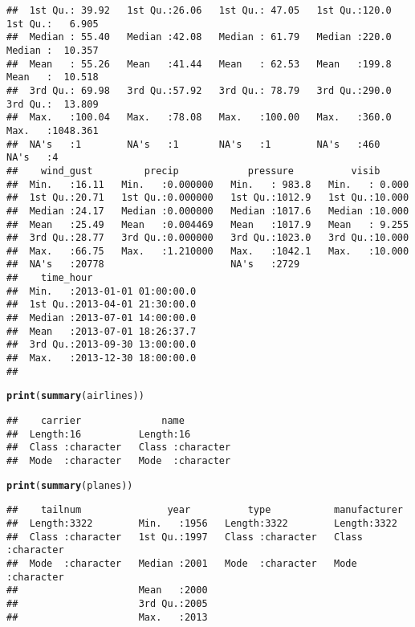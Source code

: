 \documentclass{article}\usepackage[]{graphicx}\usepackage[]{xcolor}
\makeatletter
\newcommand{\hlstd}[1]{\textcolor[rgb]{0.345,0.345,0.345}{#1}}%
\newcommand{\hlkwd}[1]{\textcolor[rgb]{0.737,0.353,0.396}{\textbf{#1}}}%
\newenvironment{kframe}{%
 \def\at@end@of@kframe{}%
 \ifinner\ifhmode%
  \def\at@end@of@kframe{\end{minipage}}%
  \begin{minipage}{\columnwidth}%
 \fi\fi%
 \def\FrameCommand##1{\hskip\@totalleftmargin \hskip-\fboxsep
 \colorbox{shadecolor}{##1}\hskip-\fboxsep
     \hskip-\linewidth \hskip-\@totalleftmargin \hskip\columnwidth}%
 \MakeFramed {\advance\hsize-\width
   \@totalleftmargin\z@ \linewidth\hsize
   \@setminipage}}%
 {\par\unskip\endMakeFramed%
 \at@end@of@kframe}
\newenvironment{knitrout}{}{} %
\makeatother
\begin{document}
\begin{knitrout}
\begin{kframe}
\begin{verbatim}
##  1st Qu.: 39.92   1st Qu.:26.06   1st Qu.: 47.05   1st Qu.:120.0   1st Qu.:   6.905  
##  Median : 55.40   Median :42.08   Median : 61.79   Median :220.0   Median :  10.357  
##  Mean   : 55.26   Mean   :41.44   Mean   : 62.53   Mean   :199.8   Mean   :  10.518  
##  3rd Qu.: 69.98   3rd Qu.:57.92   3rd Qu.: 78.79   3rd Qu.:290.0   3rd Qu.:  13.809  
##  Max.   :100.04   Max.   :78.08   Max.   :100.00   Max.   :360.0   Max.   :1048.361  
##  NA's   :1        NA's   :1       NA's   :1        NA's   :460     NA's   :4         
##    wind_gust         precip            pressure          visib       
##  Min.   :16.11   Min.   :0.000000   Min.   : 983.8   Min.   : 0.000  
##  1st Qu.:20.71   1st Qu.:0.000000   1st Qu.:1012.9   1st Qu.:10.000  
##  Median :24.17   Median :0.000000   Median :1017.6   Median :10.000  
##  Mean   :25.49   Mean   :0.004469   Mean   :1017.9   Mean   : 9.255  
##  3rd Qu.:28.77   3rd Qu.:0.000000   3rd Qu.:1023.0   3rd Qu.:10.000  
##  Max.   :66.75   Max.   :1.210000   Max.   :1042.1   Max.   :10.000  
##  NA's   :20778                      NA's   :2729                     
##    time_hour                    
##  Min.   :2013-01-01 01:00:00.0  
##  1st Qu.:2013-04-01 21:30:00.0  
##  Median :2013-07-01 14:00:00.0  
##  Mean   :2013-07-01 18:26:37.7  
##  3rd Qu.:2013-09-30 13:00:00.0  
##  Max.   :2013-12-30 18:00:00.0  
## 
\end{verbatim}
\begin{alltt}
\hlkwd{print}\hlstd{(}\hlkwd{summary}\hlstd{(airlines))}
\end{alltt}
\begin{verbatim}
##    carrier              name          
##  Length:16          Length:16         
##  Class :character   Class :character  
##  Mode  :character   Mode  :character
\end{verbatim}
\begin{alltt}
\hlkwd{print}\hlstd{(}\hlkwd{summary}\hlstd{(planes))}
\end{alltt}
\begin{verbatim}
##    tailnum               year          type           manufacturer      
##  Length:3322        Min.   :1956   Length:3322        Length:3322       
##  Class :character   1st Qu.:1997   Class :character   Class :character  
##  Mode  :character   Median :2001   Mode  :character   Mode  :character  
##                     Mean   :2000                                        
##                     3rd Qu.:2005                                        
##                     Max.   :2013                                        

\end{verbatim}
\end{kframe}
\end{knitrout}
\end{document}
